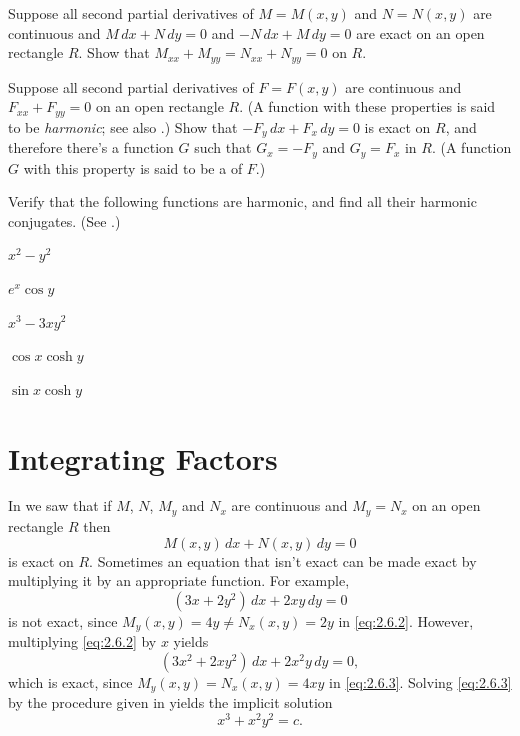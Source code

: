 \begin{exerciselist}
\item\label{exer:2.5.42}Suppose  all second partial derivatives of $M=M(x,y)$ and $N=N(x,y)$
are continuous and $M\,dx+N\,dy=0$ and $-N\,dx+M\,dy=0$ are
exact on an open rectangle  $R$.  Show that
$M_{xx}+M_{yy}=N_{xx}+N_{yy}=0$ on
$R$.

\item\label{exer:2.5.43}Suppose all second partial derivatives of
$F=F(x,y)$ are continuous and $F_{xx}+F_{yy}=0$ on an open rectangle
$R$. (A function with these properties is said to be \emph{\color{blue}harmonic};
see also .) Show that $-F_y\,dx+F_x\,dy=0$ is
exact on $R$, and
therefore there's a function $G$ such that
$G_x=-F_y$ and $G_y=F_x$ in $R$. (A function $G$ with this property is
said to be a  of $F$.)

\item\label{exer:2.5.44}Verify that the following functions are harmonic, and find all their
harmonic conjugates.  (See .)

\begin{alist*}[columns=3]
\item $x^2-y^2$
\item $e^x\cos y$
\item $x^3-3xy^2$
\item $\cos x\cosh y$
\item $\sin x\cosh y$
\end{alist*}

\end{exerciselist}


\section{Integrating Factors}\label{sec:integrating_factors}

In  we saw that if $M$, $N$, $M_y$ and $N_x$ are
continuous and $M_y=N_x$ on an open rectangle $R$ then
\begin{equation} \label{eq:2.6.1}
M(x,y)\,dx+N(x,y)\,dy=0
\end{equation}
is exact on $R$. Sometimes an equation that isn't  exact can be made
exact by multiplying it by an appropriate function. For example,
\begin{equation}\label{eq:2.6.2}
(3x+2y^2)\,dx+2xy\,dy=0
\end{equation}
is  not exact, since
$M_y(x,y)=4y\ne  N_x(x,y)=2y$ in \eqref{eq:2.6.2}.
 However, multiplying \eqref{eq:2.6.2}  by $x$ yields
\begin{equation}\label{eq:2.6.3}
(3x^2+2xy^2)\,dx+2x^2y\,dy=0,
\end{equation}
which is exact, since
$M_y(x,y)=N_x(x,y)=4xy$ in \eqref{eq:2.6.3}.
Solving \eqref{eq:2.6.3} by the procedure given in 
yields the implicit solution
\[
x^3+x^2y^2=c.
\]

